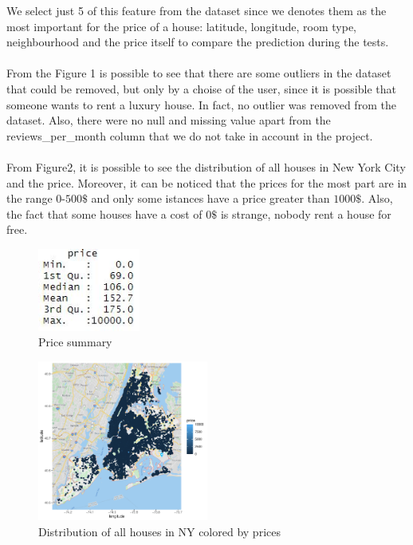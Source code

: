 \documentclass{FR16}
\begin{document}
We select just 5 of this feature from the dataset since we denotes them as the most important for the price of a house: latitude, longitude, room type, neighbourhood and the price itself to compare the prediction during the tests. \\\\
From the Figure 1 is possible to see that there are some outliers in the dataset that could be removed, but only by a choise of the user, since it is possible that someone wants to rent a luxury house. In fact, no outlier was removed from the dataset. Also, there were no null and missing value apart from the reviews\_per\_month column that we do not take in account in the project.
\\
\\From Figure2, it is possible to see the distribution of all houses in New York City and the price. Moreover, it can be noticed that the prices for the most part are in the range $0$-$500\$$ and only some istances have a price greater than $1000\$$. Also, the fact that some houses have a cost of $0\$$ is strange, nobody rent a house for free.
 \begin{figure}[H]
\centering
\includegraphics[width=0.3\textwidth]{figures/figure1.jpg} 
\caption{\label{fig:1}Price summary}
\end{figure}
\begin{figure}[H]
\centering
\includegraphics[width=0.5\textwidth]{figures/figure2.pdf} 
\caption{\label{fig:2}Distribution of all houses in NY colored by prices}
\end{figure}
\end{document}
